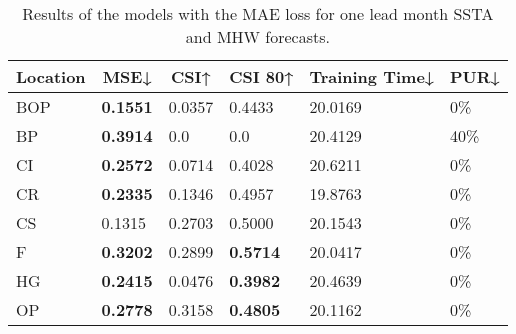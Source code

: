 \documentclass[11pt, a4paper]{article}
\begin{document}
\begin{table}[H]
\centering
\small
\caption{Results of the models with the MAE loss for one lead month SSTA and MHW forecasts.}\label{tb:mae}
\begin{tabular}{llllll}
\multicolumn{1}{c}{\textbf{Location}} & \multicolumn{1}{c}{\textbf{MSE↓}} & \multicolumn{1}{c}{\textbf{CSI↑}} & \multicolumn{1}{c}{\textbf{CSI 80↑}} & \multicolumn{1}{c}{\textbf{Training Time↓}} & \multicolumn{1}{c}{\textbf{PUR↓}} \\ \hline
BOP                         & \textbf{0.1551}                   & 0.0357                            & 0.4433                               & 20.0169                                     & 0\%                               \\
BP                        & \textbf{0.3914}                   & 0.0                               & 0.0                                  & 20.4129                                     & 40\%                              \\
CI                        & \textbf{0.2572}                   & 0.0714                            & 0.4028                               & 20.6211                                     & 0\%                               \\
CR                           & \textbf{0.2335}                   & 0.1346                            & 0.4957                               & 19.8763                                     & 0\%                               \\
CS                           & 0.1315                            & 0.2703                            & 0.5000                               & 20.1543                                     & 0\%                               \\
F                             & \textbf{0.3202}                   & 0.2899                            & \textbf{0.5714}                      & 20.0417                                     & 0\%                               \\
HG                          & \textbf{0.2415}                   & 0.0476                            & \textbf{0.3982}                      & 20.4639                                     & 0\%                               \\
OP                       & \textbf{0.2778}                   & 0.3158                            & \textbf{0.4805}                      & 20.1162                                     & 0\%                               \\

\end{tabular}
\end{table}
\end{document}
